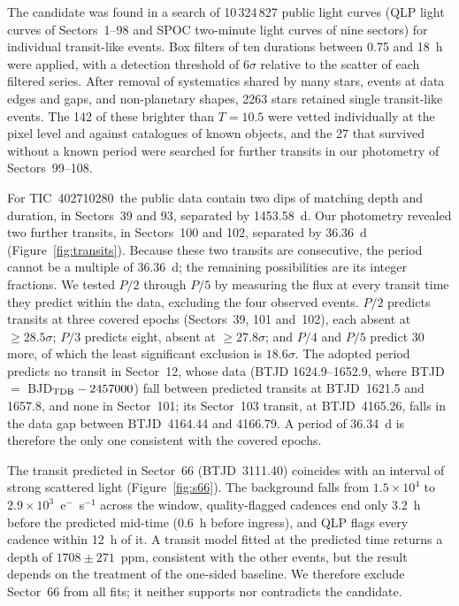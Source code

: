 \documentclass[twocolumn]{aastex631}
\newcommand{\tic}{TIC~402710280}
\begin{document}
The candidate was found in a search of 10\,324\,827 public light curves (QLP light curves of Sectors~1--98 and SPOC two-minute light curves of nine sectors) for individual transit-like events. Box filters of ten durations between 0.75 and 18~h were applied, with a detection threshold of $6\sigma$ relative to the scatter of each filtered series. After removal of systematics shared by many stars, events at data edges and gaps, and non-planetary shapes, 2263 stars retained single transit-like events. The 142 of these brighter than $T = 10.5$ were vetted individually at the pixel level and against catalogues of known objects, and the 27 that survived without a known period were searched for further transits in our photometry of Sectors~99--108.

For \tic\ the public data contain two dips of matching depth and duration, in Sectors~39 and 93, separated by 1453.58~d. Our photometry revealed two further transits, in Sectors~100 and 102, separated by 36.36~d (Figure~\ref{fig:transits}). Because these two transits are consecutive, the period cannot be a multiple of 36.36~d; the remaining possibilities are its integer fractions. We tested $P/2$ through $P/5$ by measuring the flux at every transit time they predict within the data, excluding the four observed events. $P/2$ predicts transits at three covered epochs (Sectors~39, 101 and~102), each absent at $\geq 28.5\sigma$; $P/3$ predicts eight, absent at $\geq 27.8\sigma$; and $P/4$ and $P/5$ predict 30 more, of which the least significant exclusion is $18.6\sigma$. The adopted period predicts no transit in Sector~12, whose data (BTJD 1624.9--1652.9, where BTJD $=$ BJD$_{\rm TDB} - 2457000$) fall between predicted transits at BTJD~1621.5 and 1657.8, and none in Sector~101; its Sector~103 transit, at BTJD~4165.26, falls in the data gap between BTJD~4164.44 and 4166.79. A period of 36.34~d is therefore the only one consistent with the covered epochs.

The transit predicted in Sector~66 (BTJD~3111.40) coincides with an interval of strong scattered light (Figure~\ref{fig:s66}). The background falls from $1.5 \times 10^4$ to $2.9 \times 10^3$~e$^-$~s$^{-1}$ across the window, quality-flagged cadences end only 3.2~h before the predicted mid-time (0.6~h before ingress), and QLP flags every cadence within 12~h of it. A transit model fitted at the predicted time returns a depth of $1708 \pm 271$~ppm, consistent with the other events, but the result depends on the treatment of the one-sided baseline. We therefore exclude Sector~66 from all fits; it neither supports nor contradicts the candidate.
\end{document}
